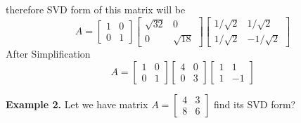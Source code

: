 \documentclass[a4paper,11pt]{article}
\numberwithin{equation}{section}
\begin{document}
\begin{itemize}
therefore SVD form of this matrix will be 
\[
A=\begin{bmatrix}
    1&0\\0&1
\end{bmatrix}
\begin{bmatrix}
    \sqrt{32}&0\\
    0&\sqrt{18}
\end{bmatrix}
\begin{bmatrix}
    {1}/{\sqrt{2}}&{1}/{\sqrt{2}}\\
    {1}/{\sqrt{2}}&-{1}/{\sqrt{2}}
\end{bmatrix}
\]
After Simplification
\[
A=\begin{bmatrix}
    1&0\\0&1
\end{bmatrix}
\begin{bmatrix}
    4&0\\
    0&3
\end{bmatrix}
\begin{bmatrix}
    {1}&{1}\\
    {1}&-{1}
\end{bmatrix}
\]

\textbf{Example 2.} Let we have  matrix $A=\begin{bmatrix}
    4&3\\8&6
\end{bmatrix}$ find its SVD form?\\


\end{itemize}
\end{document}
